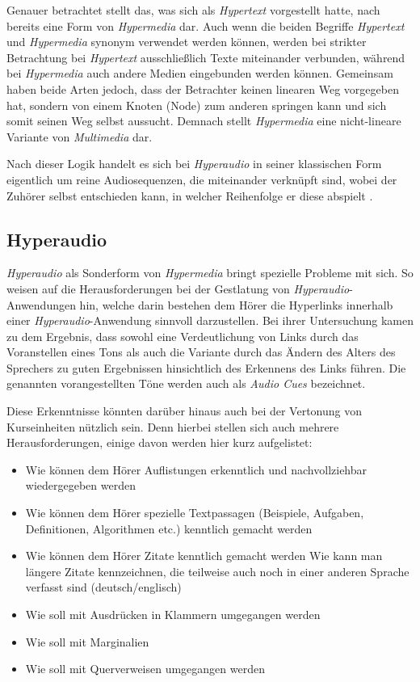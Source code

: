 Genauer betrachtet stellt das, was \cite{nelson1965complex} sich als \textit{Hypertext} vorgestellt hatte, nach \cite{nielsen2013multimedia} bereits eine Form von \textit{Hypermedia} dar. Auch wenn die beiden Begriffe \textit{Hypertext} und \textit{Hypermedia} synonym verwendet werden können, werden bei strikter Betrachtung bei \textit{Hypertext} ausschließlich Texte miteinander verbunden, während bei \textit{Hypermedia} auch andere Medien eingebunden werden können. Gemeinsam haben beide Arten jedoch, dass der Betrachter keinen linearen Weg vorgegeben hat, sondern von einem Knoten (Node) zum anderen springen kann und sich somit seinen Weg selbst aussucht. Demnach stellt \textit{Hypermedia} eine nicht-lineare Variante von \textit{Multimedia} dar.

Nach dieser Logik handelt es sich bei \textit{Hyperaudio} in seiner klassischen Form eigentlich um reine Audiosequenzen, die miteinander verknüpft sind, wobei der Zuhörer selbst entschieden kann, in welcher Reihenfolge er diese abspielt \citep{zumbach2006learning}.

\subsection{Hyperaudio}
\label{sec:audiocues}
\textit{Hyperaudio} als Sonderform von \textit{Hypermedia} bringt spezielle Probleme mit sich. So weisen \cite{donker2007gestaltung} auf die Herausforderungen bei der Gestlatung von \textit{Hyperaudio}-Anwendungen hin, welche darin bestehen dem Hörer die Hyperlinks innerhalb einer \textit{Hyperaudio}-Anwendung sinnvoll darzustellen. Bei ihrer Untersuchung kamen \cite{donker2007gestaltung} zu dem Ergebnis, \glqq dass sowohl eine Verdeutlichung von Links durch das Voranstellen eines Tons als auch die Variante durch das
Ändern des Alters des Sprechers zu guten Ergebnissen hinsichtlich des Erkennens des Links
führen.\grqq{} Die genannten vorangestellten Töne werden auch als \textit{Audio Cues} bezeichnet.

Diese Erkenntnisse könnten darüber hinaus auch bei der Vertonung von Kurseinheiten nützlich sein. Denn hierbei stellen sich auch mehrere Herausforderungen, einige davon werden hier kurz aufgelistet:

\begin{itemize}
\item Wie können dem Hörer Auflistungen erkenntlich und nachvollziehbar wiedergegeben werden
\item Wie können dem Hörer spezielle Textpassagen (Beispiele, Aufgaben, Definitionen, Algorithmen etc.) kenntlich gemacht werden
\item Wie können dem Hörer Zitate kenntlich gemacht werden
Wie kann man längere Zitate kennzeichnen, die teilweise auch noch in einer anderen Sprache verfasst sind (deutsch/englisch)
\item Wie soll mit Ausdrücken in Klammern umgegangen werden
\item Wie soll mit Marginalien
\item Wie soll mit Querverweisen umgegangen werden
\end{itemize} 

